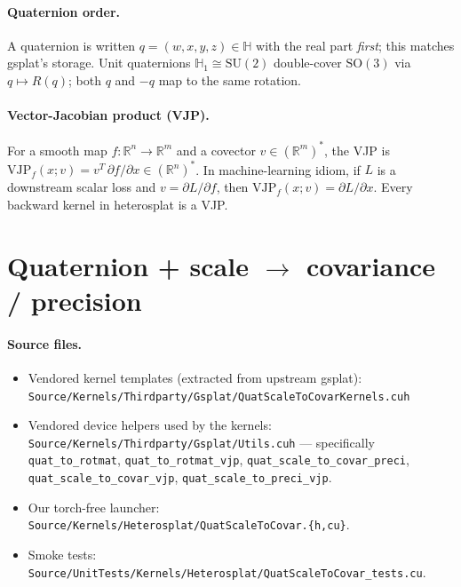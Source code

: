 \documentclass[11pt]{article}
\newcommand{\SO}{\mathrm{SO}}
\newcommand{\SU}{\mathrm{SU}}
\newcommand{\R}{\mathbb{R}}
\newcommand{\HQ}{\mathbb{H}}
\begin{document}
\paragraph{Quaternion order.}
A quaternion is written $q = (w, x, y, z) \in \HQ$ with the real part
\emph{first}; this matches gsplat's storage. Unit quaternions
$\HQ_{1} \cong \SU(2)$ double-cover $\SO(3)$ via $q \mapsto R(q)$;
both $q$ and $-q$ map to the same rotation.

\paragraph{Vector-Jacobian product (VJP).}
For a smooth map $f : \R^{n} \to \R^{m}$ and a covector
$v \in (\R^{m})^{*}$, the VJP is $\mathrm{VJP}_{f}(x; v) = v^{T}\,
\partial f / \partial x \in (\R^{n})^{*}$. In machine-learning idiom,
if $L$ is a downstream scalar loss and $v = \partial L/\partial f$,
then $\mathrm{VJP}_{f}(x; v) = \partial L/\partial x$. Every backward
kernel in heterosplat is a VJP.

\section{Quaternion + scale \texorpdfstring{$\to$}{to} covariance / precision}
\label{sec:qsc}

\paragraph{Source files.}
\begin{itemize}
  \item Vendored kernel templates (extracted from upstream gsplat):\\
  \texttt{Source/Kernels/Thirdparty/Gsplat/QuatScaleToCovarKernels.cuh}
  \item Vendored device helpers used by the kernels:\\
  \texttt{Source/Kernels/Thirdparty/Gsplat/Utils.cuh} ---
  specifically \texttt{quat\_to\_rotmat}, \texttt{quat\_to\_rotmat\_vjp},
  \texttt{quat\_scale\_to\_covar\_preci}, \texttt{quat\_scale\_to\_covar\_vjp},
  \texttt{quat\_scale\_to\_preci\_vjp}.
  \item Our torch-free launcher:\\
  \texttt{Source/Kernels/Heterosplat/QuatScaleToCovar.\{h,cu\}}.
  \item Smoke tests:
  \texttt{Source/UnitTests/Kernels/Heterosplat/QuatScaleToCovar\_tests.cu}.
\end{itemize}
\end{document}
